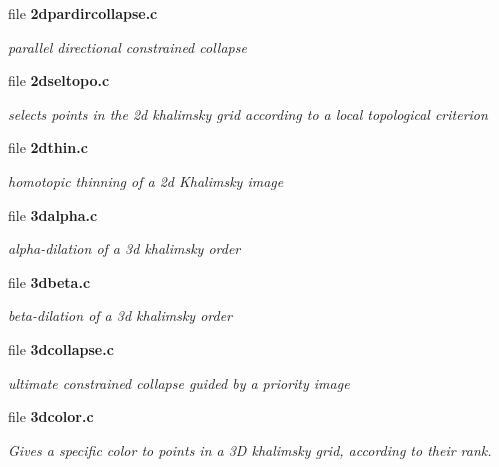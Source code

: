 \begin{CompactItemize}
\item 
file \bf{2dpardircollapse.c}
\begin{CompactList}\small\item\em parallel directional constrained collapse \item\end{CompactList}

\item 
file \bf{2dseltopo.c}
\begin{CompactList}\small\item\em selects points in the 2d khalimsky grid according to a local topological criterion \item\end{CompactList}

\item 
file \bf{2dthin.c}
\begin{CompactList}\small\item\em homotopic thinning of a 2d Khalimsky image \item\end{CompactList}

\item 
file \bf{3dalpha.c}
\begin{CompactList}\small\item\em alpha-dilation of a 3d khalimsky order \item\end{CompactList}

\item 
file \bf{3dbeta.c}
\begin{CompactList}\small\item\em beta-dilation of a 3d khalimsky order \item\end{CompactList}

\item 
file \bf{3dcollapse.c}
\begin{CompactList}\small\item\em ultimate constrained collapse guided by a priority image \item\end{CompactList}

\item 
file \bf{3dcolor.c}
\begin{CompactList}\small\item\em Gives a specific color to points in a 3D khalimsky grid, according to their rank. \item\end{CompactList}


\end{CompactItemize}
